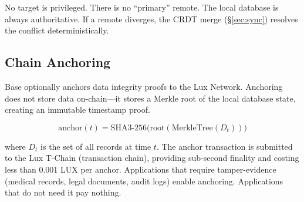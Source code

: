 No target is privileged. There is no ``primary'' remote. The local database
is always authoritative. If a remote diverges, the CRDT merge
(\S\ref{sec:sync}) resolves the conflict deterministically.

\subsection{Chain Anchoring}

Base optionally anchors data integrity proofs to the Lux Network. Anchoring
does not store data on-chain---it stores a Merkle root of the local database
state, creating an immutable timestamp proof.

\begin{equation}
\text{anchor}(t) = \text{SHA3-256}\bigl(\text{root}(\text{MerkleTree}(D_t))\bigr)
\end{equation}

where $D_t$ is the set of all records at time $t$. The anchor transaction is
submitted to the Lux T-Chain (transaction chain), providing sub-second
finality and costing less than 0.001 LUX per anchor. Applications that require
tamper-evidence (medical records, legal documents, audit logs) enable anchoring.
Applications that do not need it pay nothing.

